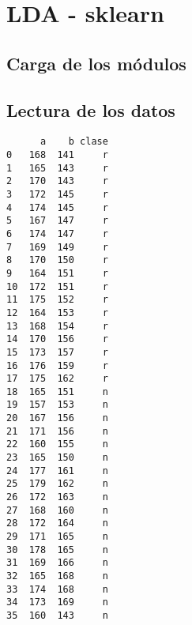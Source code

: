 \chapter{LDA - sklearn}
\section{Carga de los módulos}

\begin{Shaded}
\begin{Highlighting}[]
\end{Highlighting}
\end{Shaded}


\section{Lectura de los datos}


\begin{Shaded}
\begin{Highlighting}[]
\OperatorTok{=}\OperatorTok{=}\StringTok{\textquotesingle{}}\StringTok{\textquotesingle{}}\NormalTok{)}
\end{Highlighting}
\end{Shaded}


\begin{Shaded}
\begin{Highlighting}[]
\end{Highlighting}
\end{Shaded}

\begin{verbatim}
      a    b clase
0   168  141     r
1   165  143     r
2   170  143     r
3   172  145     r
4   174  145     r
5   167  147     r
6   174  147     r
7   169  149     r
8   170  150     r
9   164  151     r
10  172  151     r
11  175  152     r
12  164  153     r
13  168  154     r
14  170  156     r
15  173  157     r
16  176  159     r
17  175  162     r
18  165  151     n
19  157  153     n
20  167  156     n
21  171  156     n
22  160  155     n
23  165  150     n
24  177  161     n
25  179  162     n
26  172  163     n
27  168  160     n
28  172  164     n
29  171  165     n
30  178  165     n
31  169  166     n
32  165  168     n
33  174  168     n
34  173  169     n
35  160  143     n
\end{verbatim}

